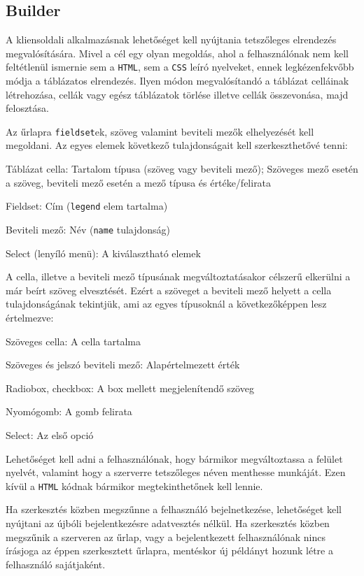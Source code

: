 \documentclass[12pt,a4paper,twoside]{article}
\newcommand{\desc}{
  \begin{description}{}{}
    \setlength\itemsep{0pt}
    \setlength\parskip{0pt}
    \setlength\topsep{0pt}
    \setlength\partopsep{0pt}
    \small}
\newcommand{\ed}{
  \end{description}
  \normalsize }
\begin{document}
\subsection{Builder}

A kliensoldali alkalmazásnak lehetőséget kell nyújtania tetszőleges elrendezés
megvalósítására. Mivel a cél egy olyan megoldás, ahol a felhasználónak nem kell
feltétlenül ismernie sem a \texttt{HTML}, sem a \texttt{CSS} leíró nyelveket,
ennek legkézenfekvőbb módja a táblázatos elrendezés. Ilyen módon megvalósítandó
a táblázat celláinak létrehozása, cellák vagy egész táblázatok törlése illetve
cellák összevonása, majd felosztása.

Az űrlapra \texttt{fieldset}ek, szöveg valamint beviteli mezők elhelyezését
kell megoldani. Az egyes elemek következő tulajdonságait kell szerkeszthetővé
tenni:

\clearpage
\desc
  \item[Táblázat cella:] Tartalom típusa (szöveg vagy beviteli mező); Szöveges
    mező esetén a szöveg, beviteli mező esetén a mező típusa és értéke/felirata
  \item[Fieldset:] Cím (\texttt{legend} elem tartalma)
  \item[Beviteli mező:] Név (\texttt{name} tulajdonság)
  \item[Select (lenyíló menü):] A kiválasztható elemek
\ed

A cella, illetve a beviteli mező típusának megváltoztatásakor célszerű elkerülni
a már beírt szöveg elvesztését. Ezért a szöveget a beviteli mező helyett a cella
tulajdonságának tekintjük, ami az egyes típusoknál a következőképpen lesz
értelmezve:

\desc
  \item[Szöveges cella:] A cella tartalma
  \item[Szöveges és jelszó beviteli mező:] Alapértelmezett érték
  \item[Radiobox, checkbox:] A box mellett megjelenítendő szöveg
  \item[Nyomógomb:] A gomb felirata
  \item[Select:] Az első opció
\ed

Lehetőséget kell adni a felhasználónak, hogy bármikor megváltoztassa a
felület nyelvét, valamint hogy a szerverre tetszőleges néven menthesse
munkáját. Ezen kívül a \texttt{HTML} kódnak bármikor megtekinthetőnek kell
lennie.

Ha szerkesztés közben megszűnne a felhasználó bejelnetkezése, lehetőséget kell
nyújtani az újbóli bejelentkezésre adatvesztés nélkül. Ha szerkesztés közben
megszűnik a szerveren az űrlap, vagy a bejelentkezett felhasználónak nincs
írásjoga az éppen szerkesztett űrlapra, mentéskor új példányt hozunk létre a
felhasználó sajátjaként.
\end{document}
